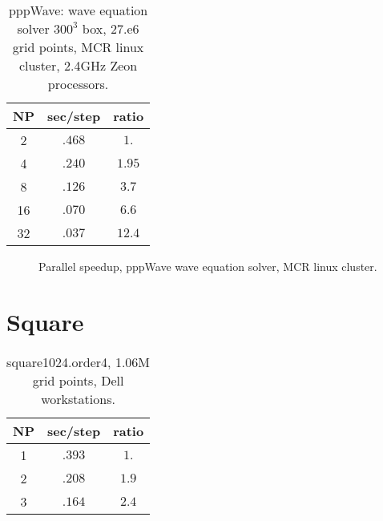 \documentclass[12pt]{article}
\begin{document}

\begin{table}[hbt]
\begin{center}\footnotesize
\begin{tabular}{|c|c|c|} \hline 
     NP       & sec/step   & ratio \\   \hline\hline 
     2        &  $.468$    & $ 1.  $   \\ 
     4        &  $.240$    & $ 1.95$   \\ 
     8        &  $.126$    & $ 3.7 $   \\ 
    16        &  $.070$    & $ 6.6 $   \\ 
    32        &  $.037$    & $12.4 $   \\ \hline 
\end{tabular}		
\end{center}		
\caption{pppWave: wave equation solver $300^3$ box, 27.e6 grid points, MCR linux cluster, 2.4GHz Zeon processors.}
 \label{tab:box} 
\end{table}

\begin{figure}
\begin{center}
\end{center}
\caption{Parallel speedup, pppWave wave equation solver, MCR linux cluster.}
\end{figure}



\clearpage
\section{Square}

\begin{table}[hbt]
\begin{center}\footnotesize
\begin{tabular}{|c|c|c|} \hline 
     NP       & sec/step   & ratio \\   \hline\hline 
     1        &  $.393$    & $ 1. $   \\ 
     2        &  $.208$    & $ 1.9$   \\ 
     3        &  $.164$    & $ 2.4$   \\ \hline 
\end{tabular}		
\end{center}		
\caption{square1024.order4, 1.06M grid points, Dell workstations.}
 \label{tab:box} 
\end{table}
\end{document}
